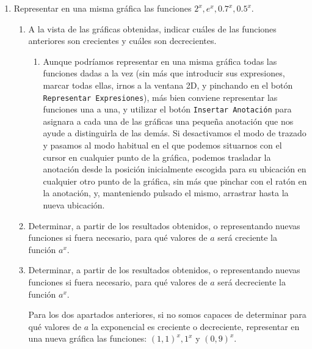 \begin{enumerate}[leftmargin=*]
\begin{enumerate}
\end{enumerate}



\item Representar en una misma gráfica las funciones $2^{x}, e^{x}, 0.7^{x}, 0.5^{x}$.
\begin{enumerate}
\item A la vista de las gráficas obtenidas, indicar cuáles de las funciones anteriores son crecientes y cuáles son decrecientes.

\begin{indicacion}
{
\begin{enumerate}

\item Aunque podríamos representar en una misma gráfica todas las
funciones dadas a la vez  (sin más que introducir sus expresiones,
marcar todas ellas, irnos a la ventana 2D, y pinchando en el botón
\texttt{Representar Expresiones}), más bien conviene representar
las funciones una a una, y utilizar el botón \texttt{Insertar
Anotación} para asignara a cada una de las gráficas una pequeña
anotación que nos ayude a distinguirla de las demás. Si
desactivamos el modo de trazado y pasamos al modo habitual en el
que podemos situarnos con el cursor en cualquier punto de la
gráfica, podemos trasladar la anotación desde la posición
inicialmente escogida para su ubicación en cualquier otro punto de
la gráfica, sin más que pinchar con el ratón en la anotación, y,
manteniendo pulsado el mismo, arrastrar hasta la nueva ubicación.

\end{enumerate}


}
\end{indicacion}

\item Determinar, a partir de los resultados obtenidos, o representando nuevas funciones si fuera necesario, para qué valores de $a$ será creciente la función $a^{x}$.


\item Determinar, a partir de los resultados obtenidos, o representando nuevas funciones si fuera necesario, para qué valores de $a$ será decreciente la función $a^{x}$.

\begin{indicacion}
{Para los dos apartados anteriores, si no somos capaces de
determinar para qué valores de $a$ la exponencial es creciente o
decreciente, representar en una nueva gráfica las funciones:
$(1,1)^x,1^x$ y $(0,9)^x$.

}
\end{indicacion}
\end{enumerate}
\end{enumerate}
